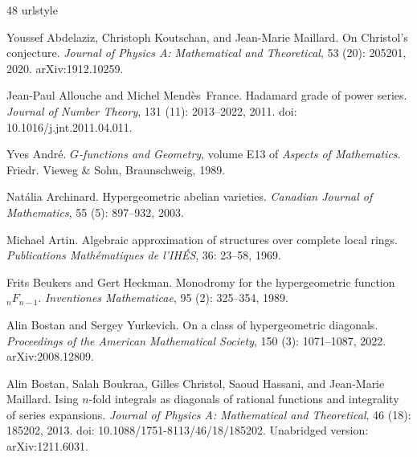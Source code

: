 \documentclass[11pt]{amsart}
\theoremstyle{definition}
\theoremstyle{remark}
\numberwithin{equation}{section}
\begin{document}
\begin{thebibliography}{48}
\providecommand{\natexlab}[1]{#1}
\providecommand{\url}[1]{\texttt{#1}}
\expandafter\ifx\csname urlstyle\endcsname\relax
  \providecommand{\doi}[1]{doi: #1}\else
  \providecommand{\doi}{doi: \begingroup \urlstyle{rm}\Url}\fi

Youssef Abdelaziz, Christoph Koutschan, and Jean-Marie Maillard.
\newblock On {C}hristol's conjecture.
\newblock \emph{Journal of Physics A: Mathematical and Theoretical},
  53 (20): 205201, 2020.
\newblock arXiv:1912.10259.

Jean-Paul Allouche and Michel Mend{\`e}s~France.
\newblock Hadamard grade of power series.
\newblock \emph{Journal of Number Theory}, 131 (11):
  2013--2022, 2011.
\newblock \doi{10.1016/j.jnt.2011.04.011}.

Yves Andr{\'e}.
\newblock \emph{{$G$}-functions and Geometry}, volume E13 of \emph{Aspects of
  Mathematics}.
\newblock Friedr. Vieweg \& Sohn, Braunschweig, 1989.

Nat{\'a}lia Archinard.
\newblock Hypergeometric abelian varieties.
\newblock \emph{Canadian Journal of Mathematics}, 55 (5):
  897--932, 2003.

Michael Artin.
\newblock Algebraic approximation of structures over complete local rings.
\newblock \emph{Publications Math{\'e}matiques de l'IH{\'E}S}, 36:
  23--58, 1969.

Frits Beukers and Gert Heckman.
\newblock Monodromy for the hypergeometric function {${}_nF_{n-1}$}.
\newblock \emph{Inventiones Mathematicae}, 95 (2): 325--354,
  1989.

Alin Bostan and Sergey Yurkevich.
\newblock On a class of hypergeometric diagonals.
\newblock \emph{Proceedings of the American Mathematical Society}, 150
  (3): 1071--1087, 2022.
\newblock arXiv:2008.12809.

Alin Bostan, Salah Boukraa, Gilles Christol, Saoud Hassani, and Jean-Marie
  Maillard.
\newblock Ising $n$-fold integrals as diagonals of rational functions and
  integrality of series expansions.
\newblock \emph{Journal of Physics A: Mathematical and Theoretical},
  46 (18): 185202, 2013.
\newblock \doi{10.1088/1751-8113/46/18/185202}.
\newblock Unabridged version: arXiv:1211.6031.


\end{thebibliography}
\end{document}
